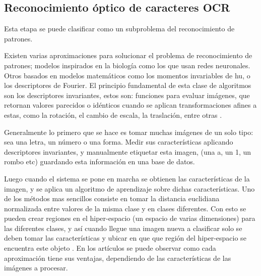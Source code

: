 \documentclass[a4paper, 11pt, oneside]{article}
\begin{document}
	\subsection{Reconocimiento óptico de caracteres OCR}
	Esta etapa se puede clasificar como un subproblema del reconocimiento de patrones.

	Existen varias aproximaciones para solucionar el problema de reconocimiento de patrones; 
	modelos inspirados en la biología como los que usan redes neuronales\cite{im_biology}. Otros
	basados en modelos matemáticos como los momentos invariables de hu\cite{art_hu}, o los
	descriptores de Fourier. El principio fundamental de esta clase de algoritmos son
	los descriptores invariantes, estos son: funciones para evaluar imágenes, que retornan valores 
	parecidos o idénticos cuando se aplican	transformaciones afines a estas, como la rotación,
	el cambio de escala, la traslación, entre otras \cite{ocrs1}.
	
	Generalmente lo primero que se hace es tomar muchas imágenes de un solo tipo: sea una letra, un 
	número o una forma. Medir sus características aplicando descriptores invariantes, y manualmente 
        etiquetar esta imagen, (una a, un 1, un rombo etc) guardando esta información en una base de datos. 
	
	Luego cuando el sistema se pone en marcha se obtienen las características de la imagen, y se
	aplica un algoritmo de aprendizaje sobre dichas características. Uno de los métodos mas
	sencillos consiste en tomar la distancia euclidiana normalizada entre valores de la misma
	clase y en clases diferentes. Con esto se pueden crear regiones en el hiper-espacio (un
	espacio de varias dimensiones) para las diferentes clases, y así cuando llegue una imagen
	nueva a clasificar solo se deben tomar las características y ubicar en que que región del
	hiper-espacio se encuentra este objeto \cite{learn1}. En los artículos se puede observar como cada 
        aproximación tiene sus ventajas, dependiendo de las características de las imágenes a procesar.
		
	
\end{document}
